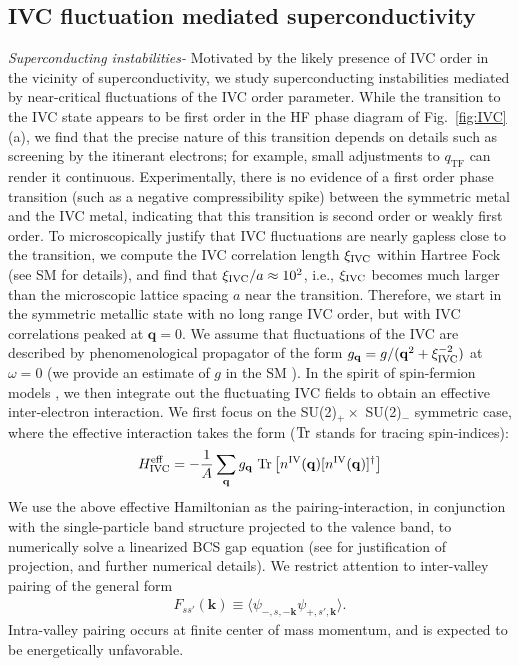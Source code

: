 \documentclass[aps,pra,twocolumn,superscriptaddress,10pt,article,nofootinbib,showpacs,longbibliography]{revtex4-1}
\def \q{{\mathbf q}}
\def \beq{\begin{eqnarray}}
\def \eeq{\end{eqnarray}}
\begin{document}
\subsection{IVC fluctuation mediated superconductivity}
\label{sec:SC}
\emph{Superconducting instabilities-}
Motivated by the likely presence of IVC order in the vicinity of superconductivity, we study superconducting instabilities mediated by near-critical fluctuations of the IVC order parameter.
While the transition to the IVC state appears to be first order in the HF phase diagram of Fig.~\ref{fig:IVC}(a), we find that the precise nature of this transition depends on details such as screening by the itinerant electrons; for example, small adjustments to $q_{\textrm{TF}}$ can render it continuous. 
Experimentally, there is no evidence of a first order phase transition (such as a negative compressibility spike) between the symmetric metal and the IVC metal, indicating that this transition is second order or weakly first order.  
To microscopically justify that IVC fluctuations are nearly gapless close to the transition, we compute the IVC correlation length $\xi_{\rm IVC}$ within Hartree Fock (see SM \cite{SM} for details), and find that $\xi_{\rm IVC}/a \approx 10^2$, i.e., $\xi_{\rm IVC}$ becomes much larger than the microscopic lattice spacing $a$ near the transition.
Therefore, we start in the symmetric metallic state with no long range IVC order, but with IVC correlations peaked at $\q = 0$. We assume that fluctuations of the IVC are described by phenomenological propagator of the form $g_{\q} = g/(\q^2 + \xi_{\rm IVC}^{-2})$ at $\omega = 0$ (we provide an estimate of $g$ in the SM \cite{SM}).
In the spirit of spin-fermion models \cite{MonthouxLonzarich,RoussevMillis,AbanovAIP2003}, we then integrate out the fluctuating IVC fields to obtain an effective inter-electron interaction.
We first focus on the SU(2)$_+ \times$ SU(2)$_-$ symmetric case, where the effective interaction takes the form ($\Tr$ stands for tracing spin-indices): 
\beq
H^{\rm eff}_{\rm IVC} = - \frac{1}{A} \sum_{\q} g_{\q} \, \Tr\left[ n^{\rm IV}(\q) [n^{\rm IV}(\q)]^\dagger \right]
\label{eq:HeffIVC}
\eeq
We use the above effective Hamiltonian as the pairing-interaction, in conjunction with the single-particle band structure projected to the valence band, to numerically solve a linearized BCS gap equation (see \cite{SM} for justification of projection, and further numerical details).
We restrict attention to inter-valley pairing of the general form
\begin{align}
F_{s s'}(\mathbf{k}) \equiv \langle \psi_{-, s, -\mathbf{k}} \psi_{+, s', \mathbf{k}} \rangle.
\end{align}
Intra-valley pairing occurs at finite center of mass momentum, and is expected to be energetically unfavorable. 
\end{document}
